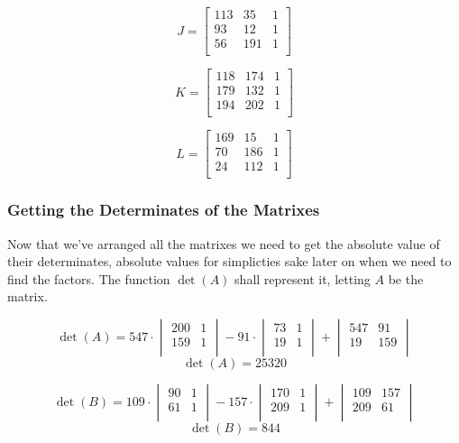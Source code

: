 \documentclass[12pft, english]{article}
\begin{document}
\begin{multicols}{2}
  \[
    J =
    \begin{bmatrix}
      113 & 35  & 1 \\
      93  & 12  & 1 \\
      56  & 191 & 1\\
    \end{bmatrix}
  \]

  \[
    K =
    \begin{bmatrix}
      118 & 174 & 1 \\
      179 & 132 & 1 \\
      194 & 202 & 1\\
    \end{bmatrix}
  \]

  \[
    L =
    \begin{bmatrix}
      169 & 15  & 1 \\
      70  & 186 & 1 \\
      24  & 112 & 1\\
    \end{bmatrix}
  \]

  \subsubsection{Getting the Determinates of the Matrixes}
  Now that we've arranged all the matrixes we need to get the absolute value of their determinates, absolute values for simplicties sake later on when we need to find the factors. The function \(\det(A)\) shall represent it, letting \(A\) be the matrix.

  \[
    \det(A) =
    547 \cdot
    \begin{vmatrix}
      200 & 1 \\
      159 & 1 \\
    \end{vmatrix}
    -
    91 \cdot
    \begin{vmatrix}
      73 & 1 \\
      19 & 1 \\
    \end{vmatrix}
    +
    \begin{vmatrix}
      547 & 91 \\
      19 & 159 \\
    \end{vmatrix}
  \]
  \[
    \det(A) = 25320
  \]

  \[
    \det(B) =
    109 \cdot
    \begin{vmatrix}
      90 & 1 \\
      61 & 1 \\
    \end{vmatrix}
    -
    157 \cdot
    \begin{vmatrix}
      170 & 1 \\
      209 & 1 \\
    \end{vmatrix}
    +
    \begin{vmatrix}
      109 & 157 \\
      209 & 61 \\
    \end{vmatrix}
  \]
  \[
    \det(B) = 844
  \]


\end{multicols}
\end{document}
